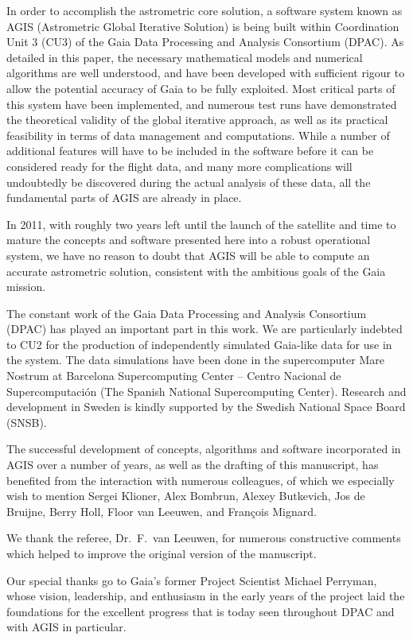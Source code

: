 \documentclass[structabstract]{aa}
\begin{document}
In order to accomplish the astrometric core solution, a software 
system known as AGIS (Astrometric Global Iterative Solution) is being built 
within Coordination Unit 3 (CU3) of the Gaia Data Processing and Analysis
Consortium (DPAC). As detailed in this paper, the necessary mathematical 
models and numerical algorithms are well understood, and have been developed 
with sufficient rigour to allow the potential accuracy of Gaia to be fully
exploited. Most critical parts of this system have been implemented,
and numerous test runs have demonstrated the theoretical validity of 
the global iterative approach, as well as its practical feasibility in terms of 
data management and computations. While a number of additional 
features will have to be included in the software before it can be considered 
ready for the flight data, and many more complications will undoubtedly be 
discovered during the actual analysis of these data, all the fundamental parts
of AGIS are already in place.
   
In 2011, with roughly two years left until the launch of the satellite 
and time to mature
the concepts and software presented here into a robust operational system,
we have no reason to doubt that AGIS will be able to compute an
accurate astrometric solution, consistent with the ambitious goals of the 
Gaia mission.

\begin{acknowledgements}
The constant work of the Gaia Data Processing and Analysis Consortium (DPAC) has
played an important part in this work. We are particularly indebted to CU2 for
the production of independently simulated Gaia-like data for use in the system.
The data simulations have been done in the supercomputer Mare Nostrum at Barcelona
Supercomputing Center -- Centro Nacional de Supercomputaci{\'o}n
(The Spanish National Supercomputing Center). 
Research and development in Sweden is kindly supported by the Swedish National
Space Board (SNSB).

The successful development of concepts, algorithms and software incorporated in 
AGIS over a number of years, as well as the drafting of this manuscript, has benefited 
from the interaction with numerous colleagues, of which we especially wish to mention 
Sergei Klioner,
Alex Bombrun,
Alexey Butkevich,
Jos de Bruijne,
Berry Holl,
Floor van Leeuwen,
and Fran\c{c}ois Mignard.

We thank the referee, Dr.~F.~van Leeuwen, for numerous constructive comments 
which helped to improve the original version of the manuscript.

Our special thanks go to Gaia's former Project Scientist
Michael Perryman, whose vision, leadership, and enthusiasm in the early years
of the project laid the foundations for the excellent progress that is today seen
throughout DPAC and with AGIS in particular.
\end{acknowledgements}
\end{document}
